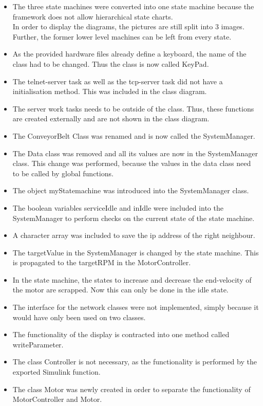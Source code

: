 \documentclass[a4paper,12pt,twoside]{scrreprt}
\begin{document}
\begin{itemize}
	\item The three state machines were converted into one state machine because the framework does not allow hierarchical state charts. \\
	In order to display the diagrams, the pictures are still split into 3 images. Further, the former lower level machines can be left from every state.  
	\item As the provided hardware files already define a keyboard, the name of the class had to be changed. Thus the class is now called KeyPad.
	\item The telnet-server task as well as the tcp-server task did not have a initialisation method. This was included in the class diagram. 
	\item The server work tasks needs to be outside of the class. Thus, these functions are created externally and are not shown in the class diagram. 
	\item The ConveyorBelt Class was renamed and is now called the SystemManager. 
	\item The Data class was removed and all its values are now in the SystemManager class. This change was performed, because the values in the data class need to be called by global functions.
	\item The object myStatemachine was introduced into the SystemManager class.
	\item The boolean variables serviceIdle and inIdle were included into the SystemManager to perform checks on the current state of the state machine. 
	\item A character array was included to save the ip address of the right neighbour. 
	\item The targetValue in the SystemManager is changed by the state machine. This is propagated to the targetRPM in the MotorController. 
	\item In the state machine, the states to increase and decrease the end-velocity of the motor are scrapped. Now this can only be done in the idle state.  
	\item The interface for the network classes were not implemented, simply because it would have only been used on two classes. 
	\item The functionality of the display is contracted into one method called writeParameter. 
	\item The class Controller is not necessary, as the functionality is performed by the exported Simulink function. 
	\item The class Motor was newly created in order to separate the functionality of MotorController and Motor. 

\end{itemize}
\end{document}
